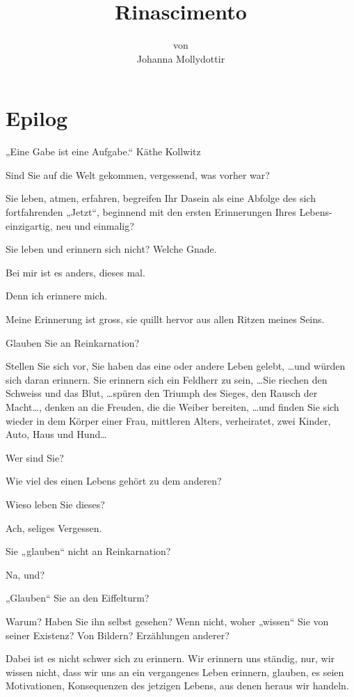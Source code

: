 \documentclass[10pt,a5paper]{book}
\author{von\\Johanna Mollydottir}
\title{Rinascimento}
\begin{document}
 
 \maketitle
\tableofcontents
 
 
\section*{Epilog}



„Eine Gabe ist eine Aufgabe.“ Käthe Kollwitz

Sind Sie auf die Welt gekommen, vergessend, was vorher war?

Sie leben,  atmen, erfahren, begreifen Ihr Dasein als eine Abfolge des sich fortfahrenden „Jetzt“, beginnend mit den ersten Erinnerungen Ihres Lebens- einzigartig, neu und einmalig?

Sie leben und erinnern sich nicht? Welche Gnade.

Bei mir ist es anders, dieses  mal.

Denn ich erinnere mich.

Meine Erinnerung ist gross, sie quillt hervor aus allen Ritzen meines Seins.

Glauben Sie an Reinkarnation?

Stellen Sie sich vor, Sie haben das eine oder andere Leben gelebt, \dots und würden sich daran erinnern. Sie erinnern sich ein Feldherr zu sein, \dots Sie riechen den Schweiss und das Blut, \dots spüren den Triumph des Sieges, den Rausch der Macht\dots, denken an die Freuden, die die Weiber bereiten, \dots und finden Sie sich wieder in dem Körper einer Frau, mittleren Alters, verheiratet, zwei Kinder, Auto, Haus und Hund\dots

Wer sind Sie?

Wie viel des einen Lebens gehört zu dem anderen?

Wieso leben Sie dieses?

Ach, seliges Vergessen.

Sie „glauben“ nicht an Reinkarnation?
 
Na, und?

„Glauben“ Sie an den Eiffelturm?

Warum? Haben Sie ihn selbst gesehen? Wenn nicht, woher „wissen“ Sie von seiner Existenz? Von Bildern? Erzählungen anderer?

Dabei ist es nicht schwer sich zu erinnern. Wir erinnern uns ständig, nur, wir wissen nicht, dass wir uns an ein vergangenes Leben erinnern, glauben, es seien Motivationen, Konsequenzen des jetzigen Lebens, aus denen heraus wir handeln.
\end{document}
